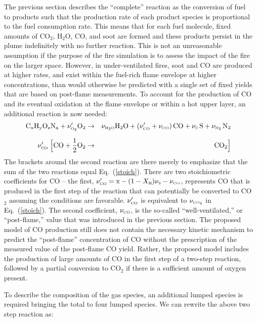 The previous section describes the ``complete'' reaction as the conversion of fuel to
products such that the production rate of each product species is proportional to the fuel consumption rate.
This means that for each fuel molecule, fixed amounts of CO$_2$, H$_2$O, CO, and soot are formed and these products
persist in the plume indefinitely with no further reaction. This is not an unreasonable assumption if
the purpose of the fire simulation is to assess the impact of the fire on the larger space.
However, in under-ventilated fires, soot and CO are produced at higher rates,
and exist within the fuel-rich flame envelope at higher concentrations,
than would otherwise be predicted with a single set of fixed yields that are based on post-flame measurements. To account for the
production of CO and its eventual oxidation at the flame envelope or within a hot upper layer,
an additional reaction is now needed:
\begin{eqnarray}
\mathrm{C_xH_yO_zN_a} +  \nu_{\tiny \hbox{O}_2}' \mathrm{O_2}  &\rightarrow&  \nu_{\tiny \hbox{H}_2\hbox{O}} \mathrm{H_2O} + (\nu_{\tiny \hbox{CO}}'+ \nu_{\tiny \hbox{CO}}) \, \mathrm{CO} +
     \nu_{\tiny \hbox{S}} \, \mathrm{S}  + \nu_{\tiny \hbox{N}_2} \, \mathrm{N_2}   \\*[.1in]
\nu_{\tiny \hbox{CO}}' \; \Big[ \mathrm{CO} + \frac{1}{2} \mathrm{O_2}  &\rightarrow&  \mathrm{CO_2}  \Big]
\label{3reac} \end{eqnarray}
The brackets around the second reaction are there merely to emphasize that the sum of the two reactions equal Eq.~(\ref{stoich}).
There are two stoichiometric coefficients for CO -- the first, $\nu_{\tiny \hbox{CO}}'=\hbox{x}-(1-X_{\tiny \hbox{H}}) \nu_{\tiny \hbox{S}}-\nu_{\tiny \hbox{CO}}$,
represents CO that is produced in the first
step of the reaction that can potentially be converted to CO$_2$ assuming the conditions are favorable. $\nu_{\tiny \hbox{CO}}'$ is equivalent to $\nu_{\tiny \hbox{CO}_2}$ in
Eq.~(\ref{stoich}). The second coefficient, $\nu_{\tiny \hbox{CO}}$,
is the so-called ``well-ventilated,'' or ``post-flame,'' value that was introduced in the previous section. The proposed model of CO production
still does not contain the necessary kinetic mechanism to predict the ``post-flame'' concentration of CO without the prescription of the
measured value of the post-flame CO yield. Rather, the proposed model includes the production of large amounts of CO in the first step of a two-step
reaction, followed by a partial conversion to CO$_2$ if there is a sufficient amount of oxygen present.

To describe the composition of the gas species, an additional lumped species is required bringing the total to four lumped species.  We can rewrite the above two step reaction as:

